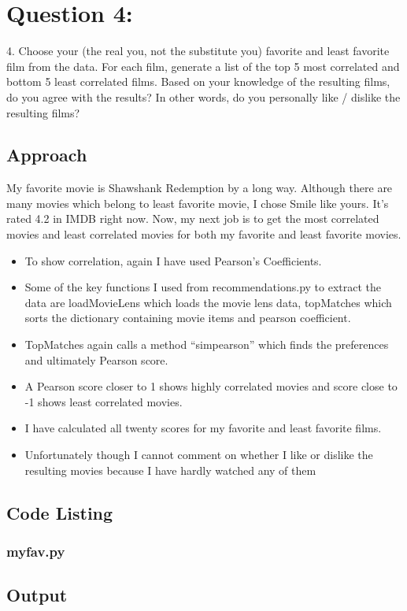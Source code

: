 \documentclass[12pt]{article}
\begin{document}
\section{Question 4: }
4.  Choose your (the real you, not the substitute you) favorite and
least favorite film from the data.  For each film, generate a list
of the top 5 most correlated and bottom 5 least correlated films.
Based on your knowledge of the resulting films, do you agree with
the results?  In other words, do you personally like / dislike
the resulting films?
\subsection{Approach}
My favorite movie is Shawshank Redemption by a long way. Although there are many movies which belong to least favorite movie, I chose Smile like yours. It’s rated 4.2 in IMDB right now. Now, my next job is to get the most correlated movies and least correlated movies for both my favorite and least favorite movies.
\begin{itemize} 
\item To show correlation, again I have used Pearson’s Coefficients.
\item Some of the key functions I used from recommendations.py to extract the data are loadMovieLens which loads the movie lens data, topMatches which sorts the dictionary containing movie items and pearson coefficient. 
\item TopMatches again calls a method ``simpearson'' which finds the preferences and ultimately Pearson score.
\item A Pearson score closer to 1 shows highly correlated movies and score close to -1 shows least correlated movies.
\item I have calculated all twenty scores for my favorite and least favorite films.
\item Unfortunately though I cannot comment on whether I like or dislike the resulting movies because I have hardly watched any of them
\end{itemize}
\subsection{Code Listing}
\subsubsection{myfav.py}

\newpage
\subsection{Output}
\end{document}
